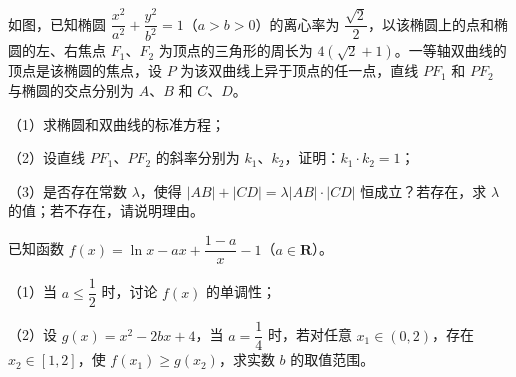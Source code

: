 \begingroup
\renewenvironment{question}{\Needspace{0.5\textheight}}{}
\begin{question}
如图，已知椭圆 $\dfrac{x^2}{a^2}+\dfrac{y^2}{b^2}=1$（$a>b>0$）的离心率为 $\dfrac{\sqrt2}2$，以该椭圆上的点和椭圆的左、右焦点 $F_1$、$F_2$ 为顶点的三角形的周长为 $4(\sqrt2+1)$。一等轴双曲线的顶点是该椭圆的焦点，设 $P$ 为该双曲线上异于顶点的任一点，直线 $PF_1$ 和 $PF_2$ 与椭圆的交点分别为 $A$、$B$ 和 $C$、$D$。

（1）求椭圆和双曲线的标准方程；

（2）设直线 $PF_1$、$PF_2$ 的斜率分别为 $k_1$、$k_2$，证明：$k_1\cdot k_2=1$；

（3）是否存在常数 $\lambda$，使得 $|AB|+|CD|=\lambda|AB|\cdot|CD|$ 恒成立？若存在，求 $\lambda$ 的值；若不存在，请说明理由。
\nopagebreak[4]
\begin{center}\end{center}
\nopagebreak[4]
\end{question}
\endgroup
\begin{question}
已知函数 $f(x)=\ln x-ax+\dfrac{1-a}{x}-1$（$a\in\mathbf R$）。

（1）当 $a\leqslant\dfrac12$ 时，讨论 $f(x)$ 的单调性；

（2）设 $g(x)=x^2-2bx+4$，当 $a=\dfrac14$ 时，若对任意 $x_1\in(0,2)$，存在 $x_2\in[1,2]$，使 $f(x_1)\geqslant g(x_2)$，求实数 $b$ 的取值范围。

\end{question}